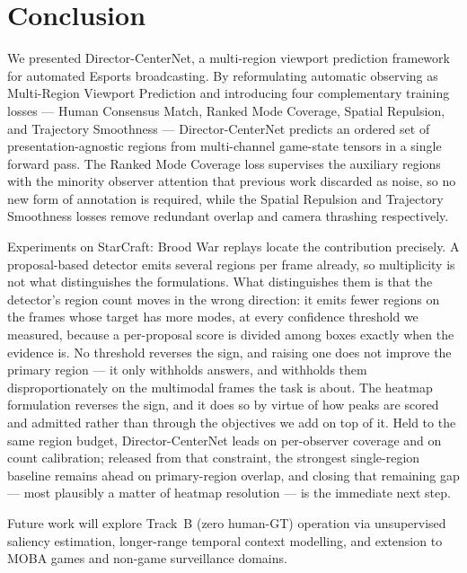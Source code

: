 \documentclass[preprint,12pt]{elsarticle}
\begin{document}
\section{Conclusion}
\label{sec:conclusion}

We presented Director-CenterNet, a multi-region viewport prediction 
framework for automated Esports broadcasting. By reformulating automatic 
observing as Multi-Region Viewport Prediction and introducing four 
complementary training losses — Human Consensus Match, Ranked Mode Coverage,
Spatial Repulsion, and Trajectory Smoothness — Director-CenterNet predicts an
ordered set of presentation-agnostic regions from multi-channel game-state
tensors in a single forward pass. The Ranked Mode Coverage loss supervises the
auxiliary regions with the minority observer attention that previous work
discarded as noise, so no new form of annotation is required, while the
Spatial Repulsion and Trajectory Smoothness losses remove redundant overlap
and camera thrashing respectively.

Experiments on StarCraft: Brood War replays locate the contribution precisely.
A proposal-based detector emits several regions per frame already, so
multiplicity is not what distinguishes the formulations. What distinguishes
them is that the detector's region count moves in the wrong direction: it emits
fewer regions on the frames whose target has more modes, at every confidence
threshold we measured, because a per-proposal score is divided among boxes
exactly when the evidence is. No threshold reverses the sign, and raising one
does not improve the primary region — it only withholds answers, and withholds
them disproportionately on the multimodal frames the task is about. The heatmap
formulation reverses the sign, and it does so by virtue of how peaks are scored
and admitted rather than through the objectives we add on top of it. Held to
the same region budget, Director-CenterNet
leads on per-observer coverage and on count calibration; released from that
constraint, the strongest single-region baseline remains ahead on
primary-region overlap, and closing that remaining gap — most plausibly a
matter of heatmap resolution — is the immediate next step.

Future work will explore Track~B (zero human-GT) operation via unsupervised
saliency estimation, longer-range temporal context modelling, and extension
to MOBA games and non-game surveillance domains.
\end{document}
